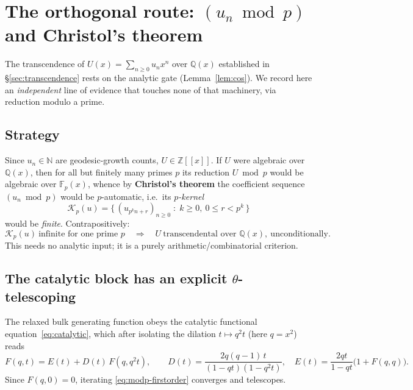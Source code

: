 \section{The orthogonal route: $(u_n \bmod p)$ and Christol's theorem}
\label{sec:modp}

The transcendence of $U(x)=\sum_{n\ge0}u_nx^n$ over $\mathbb Q(x)$ established in
\S\ref{sec:transcendence} rests on the analytic gate (Lemma~\ref{lem:cos}). We
record here an \emph{independent} line of evidence that touches none of that
machinery, via reduction modulo a prime.

\subsection{Strategy}
Since $u_n\in\mathbb N$ are geodesic-growth counts, $U\in\mathbb Z[[x]]$.
If $U$ were algebraic over $\mathbb Q(x)$, then for all but finitely many primes
$p$ its reduction $U\bmod p$ would be algebraic over $\mathbb F_p(x)$, whence by
\textbf{Christol's theorem} the coefficient sequence $(u_n\bmod p)$ would be
$p$-automatic, i.e.\ its \emph{$p$-kernel}
\[
   \mathcal K_p(u)=\bigl\{\,(u_{p^k n+r})_{n\ge0}\;:\;k\ge0,\ 0\le r<p^k\,\bigr\}
\]
would be \emph{finite}. Contrapositively:
\begin{equation}\label{eq:christol-contra}
   \mathcal K_p(u)\ \text{infinite for one prime }p
   \quad\Longrightarrow\quad
   U\ \text{transcendental over }\mathbb Q(x),\ \text{unconditionally.}
\end{equation}
This needs no analytic input; it is a purely arithmetic/combinatorial criterion.

\subsection{The catalytic block has an explicit $\theta$-telescoping}
The relaxed bulk generating function obeys the catalytic functional
equation~\eqref{eq:catalytic}, which after isolating the dilation $t\mapsto q^2t$
(here $q=x^2$) reads
\begin{equation}\label{eq:modp-firstorder}
   F(q,t)=E(t)+D(t)\,F(q,q^2t),\qquad
   D(t)=\frac{2q(q-1)\,t}{(1-qt)(1-q^2t)},\quad
   E(t)=\frac{2qt}{1-qt}\bigl(1+F(q,q)\bigr).
\end{equation}
Since $F(q,0)=0$, iterating \eqref{eq:modp-firstorder} converges and telescopes.

